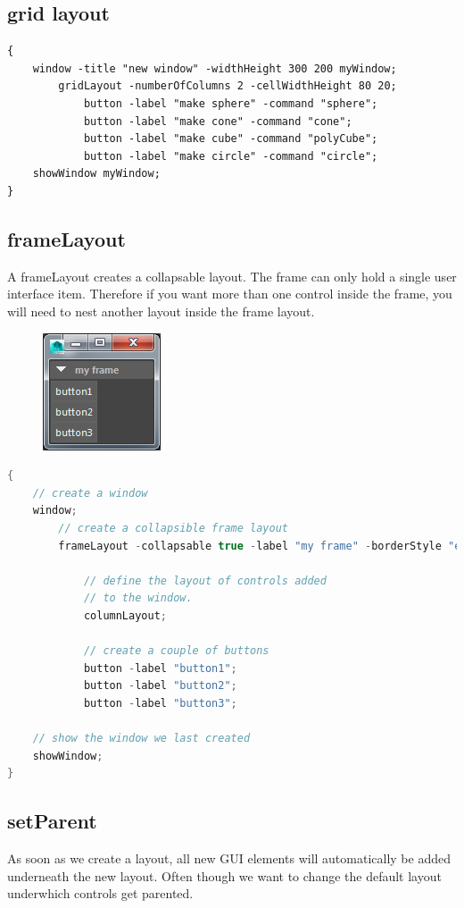 \subsection{grid layout}

\begin{lstlisting}
{
	window -title "new window" -widthHeight 300 200 myWindow;
		gridLayout -numberOfColumns 2 -cellWidthHeight 80 20; 
			button -label "make sphere" -command "sphere";
			button -label "make cone" -command "cone";
			button -label "make cube" -command "polyCube";
			button -label "make circle" -command "circle";
	showWindow myWindow;
}
\end{lstlisting}

\subsection{frameLayout}
A frameLayout creates a collapsable layout. The frame can only hold a single user interface item. Therefore if you want more than one control inside the frame, you will need to nest another layout inside the frame layout.

\begin{figure}[tbh]
	\centering
	\includegraphics[width=0.3\linewidth]{figures/GUI/frameLayout}
	\caption{}
	\label{fig:framelayout}
\end{figure}

\begin{lstlisting}[language=C++]
{
	// create a window
	window;
		// create a collapsible frame layout
		frameLayout -collapsable true -label "my frame" -borderStyle "etchedIn"; 
		
			// define the layout of controls added 
			// to the window.
			columnLayout;
			
			// create a couple of buttons
			button -label "button1";
			button -label "button2";
			button -label "button3";
			
	// show the window we last created
	showWindow;
}	
\end{lstlisting}

\subsection{setParent}
As soon as we create a layout, all new GUI elements will automatically be added underneath the new layout. Often though we want to change the default layout underwhich controls get parented.


